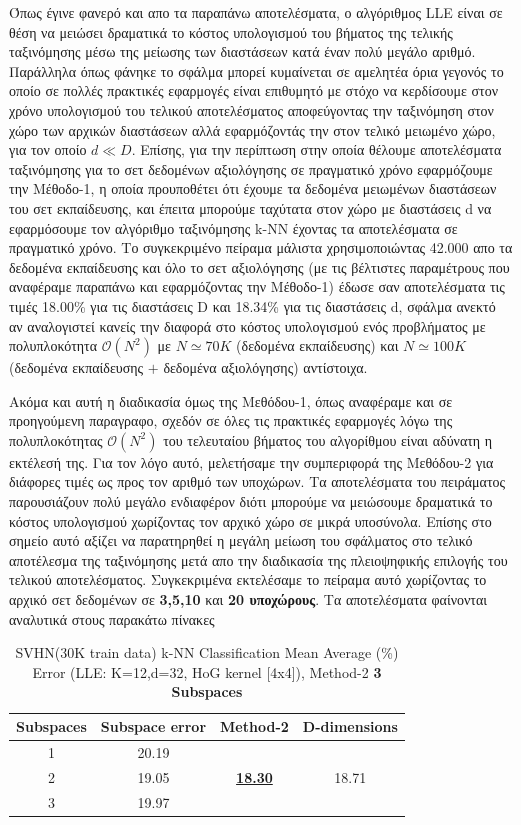 \par
Όπως έγινε φανερό και απο τα παραπάνω αποτελέσματα, ο αλγόριθμος \textlatin{LLE} είναι σε θέση να μειώσει δραματικά το κόστος υπολογισμού του βήματος της τελικής ταξινόμησης μέσω της μείωσης των διαστάσεων κατά έναν πολύ μεγάλο αριθμό. Παράλληλα όπως φάνηκε το σφάλμα μπορεί κυμαίνεται σε αμελητέα όρια γεγονός το οποίο σε πολλές πρακτικές εφαρμογές είναι επιθυμητό με στόχο να κερδίσουμε στον χρόνο υπολογισμού του τελικού αποτελέσματος αποφεύγοντας την ταξινόμηση στον χώρο των αρχικών διαστάσεων αλλά εφαρμόζοντάς την στον τελικό μειωμένο χώρο, για τον οποίο $d \ll D$. Επίσης, για την περίπτωση στην οποία θέλουμε αποτελέσματα ταξινόμησης για το σετ δεδομένων αξιολόγησης σε πραγματικό χρόνο εφαρμόζουμε την Μέθοδο-1, η οποία προυποθέτει ότι έχουμε τα δεδομένα μειωμένων διαστάσεων του σετ εκπαίδευσης, και έπειτα μπορούμε ταχύτατα στον χώρο με διαστάσεις \textlatin{d} να εφαρμόσουμε τον αλγόριθμο ταξινόμησης \textlatin{k-NN} έχοντας τα αποτελέσματα σε πραγματικό χρόνο. Το συγκεκριμένο πείραμα μάλιστα χρησιμοποιώντας 42.000 απο τα δεδομένα εκπαίδευσης και όλο το σετ αξιολόγησης (με τις βέλτιστες παραμέτρους που αναφέραμε παραπάνω και εφαρμόζοντας την Μέθοδο-1) έδωσε σαν αποτελέσματα τις τιμές 18.00\% για τις διαστάσεις \textlatin{D} και 18.34\% για τις διαστάσεις \textlatin{d}, σφάλμα ανεκτό αν αναλογιστεί κανείς την διαφορά στο κόστος υπολογισμού ενός προβλήματος με πολυπλοκότητα $ \mathcal{O}(N^2)$ με $N \simeq 70K$ (δεδομένα εκπαίδευσης) και $N \simeq 100K$ (δεδομένα εκπαίδευσης $+$ δεδομένα αξιολόγησης) αντίστοιχα.
\par
Ακόμα και αυτή η διαδικασία όμως της Μεθόδου-1, όπως αναφέραμε και σε προηγούμενη παραγραφο, σχεδόν σε όλες τις πρακτικές εφαρμογές λόγω της πολυπλοκότητας $ \mathcal{O}(N^2)$  του τελευταίου βήματος του αλγορίθμου είναι αδύνατη η εκτέλεσή της. Για τον λόγο αυτό, μελετήσαμε την συμπεριφορά της Μεθόδου-2 για διάφορες τιμές ως προς τον αριθμό των υποχώρων. Τα αποτελέσματα του πειράματος παρουσιάζουν πολύ μεγάλο ενδιαφέρον διότι μπορούμε να μειώσουμε δραματικά το κόστος υπολογισμού χωρίζοντας τον αρχικό χώρο σε μικρά υποσύνολα. Επίσης στο σημείο αυτό αξίζει να παρατηρηθεί η μεγάλη μείωση του σφάλματος στο τελικό αποτέλεσμα της ταξινόμησης μετά απο την διαδικασία της πλειοψηφικής επιλογής του τελικού αποτελέσματος. Συγκεκριμένα εκτελέσαμε το πείραμα αυτό χωρίζοντας το αρχικό σετ δεδομένων σε \textbf{3,5,10} και \textbf{20 υποχώρους}. Τα αποτελέσματα φαίνονται αναλυτικά στους παρακάτω πίνακες
\begin{table}[H]
\centering
\label{tab:table15}
\begin{tabular}{|c|c|c|c|}
\hline
\textlatin{Subspaces} & \textlatin{Subspace error} & \textlatin{Method-2} & \textlatin{D-dimensions}  \\
\hline
1 & 20.19 & & \\
2 & 19.05 & \underline{\textbf{18.30}} & 18.71 \\
3 & 19.97 & & \\
\hline
\end{tabular}
\caption{\textlatin{SVHN(30K train data) k-NN Classification Mean Average (\%) Error (LLE: K=12,d=32, HoG kernel [4x4]), Method-2 \textbf{3 Subspaces}}}
\end{table}

